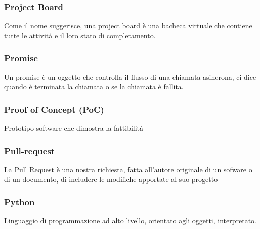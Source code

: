 \subsubsection*{Project Board}
Come il nome suggerisce, una project board è una bacheca virtuale che contiene tutte le attività e il loro stato di completamento.
\subsubsection*{Promise}
Un promise è un oggetto che controlla il flusso di una chiamata asincrona, ci dice quando è terminata la chiamata o se la chiamata è fallita.
\subsubsection*{Proof of Concept (PoC)}
Prototipo software che dimostra la fattibilità 
\subsubsection*{Pull-request}
La Pull Request è una nostra richiesta, fatta all’autore originale di un sofware o di un documento, di includere le modifiche apportate al suo progetto
\subsubsection*{Python}
Linguaggio di programmazione ad alto livello, orientato agli oggetti, interpretato.
